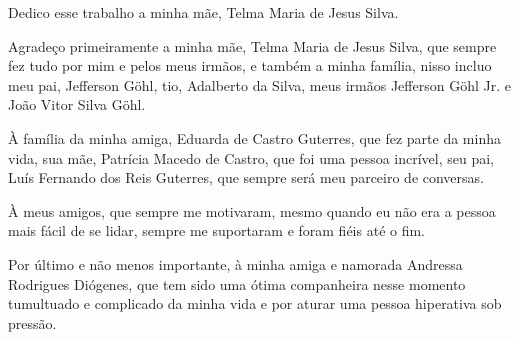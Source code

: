 \documentclass[
	12pt,				%
    oneside,
	a4paper,			%
	chapter=TITLE,		%
	english,			%
	brazil				%
	]{abntex2}
\begin{document}
\frenchspacing 


\imprimircapa

\imprimirfolhaderosto

\imprimirfolhadeaprovacao
\begin{dedicatoria}
   \vspace*{\fill}
   \centering
   \noindent
   \textit{ } \vspace*{\fill}
   Dedico esse trabalho a minha mãe, Telma Maria de Jesus Silva.
	
\end{dedicatoria}

\begin{agradecimentos}[Agradecimentos]
Agradeço primeiramente a minha mãe, Telma Maria de Jesus Silva, que sempre fez tudo por mim e pelos meus irmãos, e também a minha família, nisso incluo meu pai, Jefferson Göhl, tio, Adalberto da Silva, meus irmãos Jefferson Göhl Jr. e João Vitor Silva Göhl.

À família da minha amiga, Eduarda de Castro Guterres, que fez parte da minha vida, sua mãe, Patrícia Macedo de Castro, que foi uma pessoa incrível, seu pai, Luís Fernando dos Reis Guterres, que sempre será meu parceiro de conversas. 

À meus amigos, que sempre me motivaram, mesmo quando eu não era a pessoa mais fácil de se lidar, sempre me suportaram e foram fiéis até o fim. 

Por último e não menos importante, à minha amiga e namorada Andressa Rodrigues Diógenes, que tem sido uma ótima companheira nesse momento tumultuado e complicado da minha vida e por aturar uma pessoa hiperativa sob pressão.


\end{agradecimentos}

\end{document}
